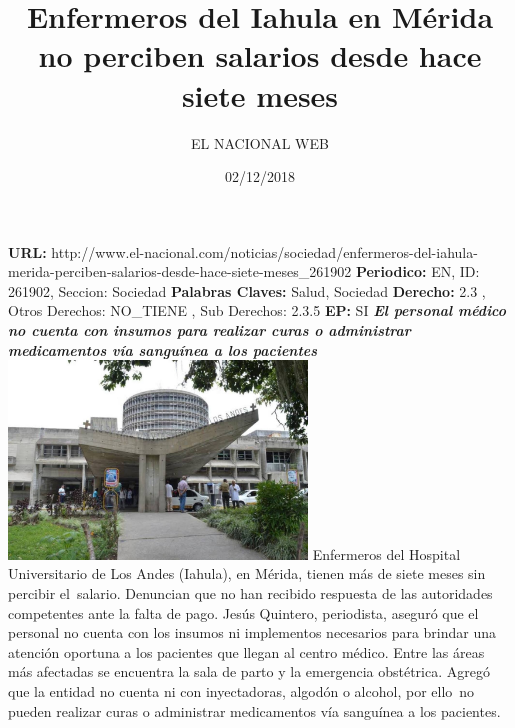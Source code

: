 \documentclass{article}%
\title{\textbf{Enfermeros del Iahula en Mérida no perciben salarios desde hace siete meses}}%
\author{EL NACIONAL WEB}%
\date{02/12/2018}%
\begin{document}
%
\normalsize%
\maketitle%
\textbf{URL: }%
http://www.el{-}nacional.com/noticias/sociedad/enfermeros{-}del{-}iahula{-}merida{-}perciben{-}salarios{-}desde{-}hace{-}siete{-}meses\_261902\newline%
%
\textbf{Periodico: }%
EN, %
ID: %
261902, %
Seccion: %
Sociedad\newline%
%
\textbf{Palabras Claves: }%
Salud, Sociedad\newline%
%
\textbf{Derecho: }%
2.3%
, Otros Derechos: %
NO\_TIENE%
, Sub Derechos: %
2.3.5%
\newline%
%
\textbf{EP: }%
SI\newline%
\newline%
%
\textbf{\textit{El personal médico no cuenta con insumos para realizar curas o administrar medicamentos vía sanguínea a los pacientes}}%
\newline%
\newline%
%
\includegraphics[width=300px]{73.jpg}%
\newline%
%
Enfermeros del Hospital Universitario de Los Andes (Iahula), en Mérida, tienen más de siete meses sin percibir el~salario. Denuncian que no han recibido respuesta de las autoridades competentes ante la falta de pago.%
\newline%
%
Jesús Quintero, periodista, aseguró que el personal no cuenta con los insumos ni implementos necesarios para brindar una atención oportuna a los pacientes que llegan al centro médico. Entre las áreas más afectadas se encuentra la sala de parto y la emergencia obstétrica.%
\newline%
%
Agregó que la entidad no cuenta ni con inyectadoras, algodón o alcohol, por ello~no pueden realizar curas o administrar medicamentos vía sanguínea a los pacientes.%
\newline%
%
\end{document}
